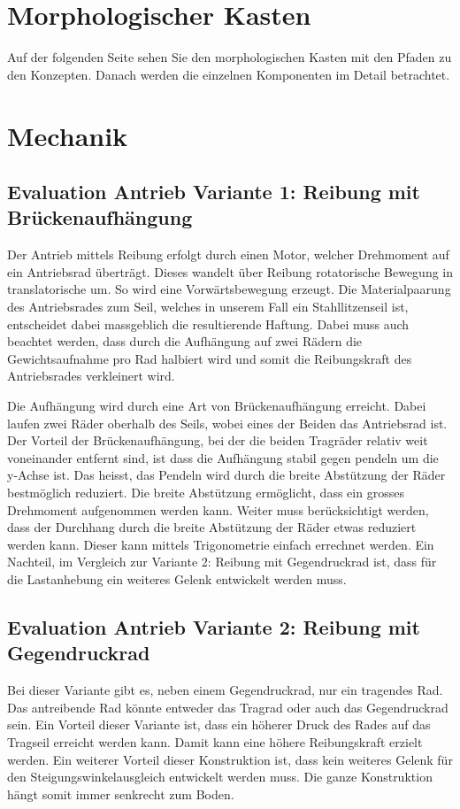 \documentclass[a4paper]{report}
\begin{document}
\section{Morphologischer Kasten}
\label{app:sec:MorphKasten}
Auf der folgenden Seite sehen Sie den morphologischen Kasten mit den Pfaden zu den Konzepten. Danach werden die einzelnen Komponenten im Detail betrachtet.



\section{Mechanik}
\label{app:sec:Mech}
\subsection{Evaluation Antrieb Variante 1: Reibung mit Brückenaufhängung}
\label{app:ssec:EvalAntrieb1}
Der Antrieb mittels Reibung erfolgt durch einen Motor, welcher Drehmoment auf ein Antriebsrad überträgt. Dieses wandelt über Reibung rotatorische Bewegung in translatorische um. So wird eine Vorwärtsbewegung erzeugt. Die Materialpaarung des Antriebsrades zum Seil, welches in unserem Fall ein Stahllitzenseil ist, entscheidet dabei massgeblich die resultierende Haftung. Dabei muss auch beachtet werden, dass durch die Aufhängung auf zwei Rädern die Gewichtsaufnahme pro Rad halbiert wird und somit die Reibungskraft des Antriebsrades verkleinert wird.

Die Aufhängung wird durch eine Art von Brückenaufhängung erreicht. Dabei laufen zwei Räder oberhalb des Seils, wobei eines der Beiden das Antriebsrad ist. Der Vorteil der Brückenaufhängung, bei der die beiden Tragräder relativ weit voneinander entfernt sind, ist dass die Aufhängung stabil gegen pendeln um die y-Achse ist. Das heisst, das Pendeln wird durch die breite Abstützung der Räder bestmöglich reduziert. Die breite Abstützung ermöglicht, dass ein grosses Drehmoment aufgenommen werden kann. Weiter muss berücksichtigt werden, dass der Durchhang durch die breite Abstützung der Räder etwas reduziert werden kann. Dieser kann mittels Trigonometrie einfach errechnet werden. Ein Nachteil, im Vergleich zur Variante 2: Reibung mit Gegendruckrad ist, dass für die Lastanhebung ein weiteres Gelenk entwickelt werden muss.

\subsection{Evaluation Antrieb Variante 2: Reibung mit Gegendruckrad}
\label{app:ssec:EvalAntrieb2}
Bei dieser Variante gibt es, neben einem Gegendruckrad, nur ein tragendes Rad. Das antreibende Rad könnte entweder das Tragrad oder auch das Gegendruckrad sein. Ein Vorteil dieser Variante ist, dass ein höherer Druck des Rades auf das Tragseil erreicht werden kann. Damit kann eine höhere Reibungskraft erzielt werden. Ein weiterer Vorteil dieser Konstruktion ist, dass kein weiteres Gelenk für den Steigungswinkelausgleich entwickelt werden muss. Die ganze Konstruktion hängt somit immer senkrecht zum Boden.
\end{document}
